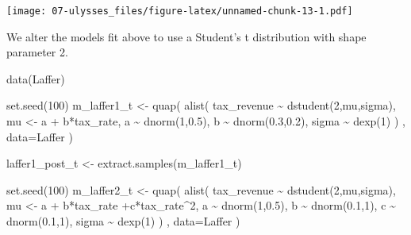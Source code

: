 \documentclass[
]{book}
\newenvironment{Shaded}{\begin{snugshade}}{\end{snugshade}}
\newcommand{\AttributeTok}[1]{\textcolor[rgb]{0.77,0.63,0.00}{#1}}
\newcommand{\DecValTok}[1]{\textcolor[rgb]{0.00,0.00,0.81}{#1}}
\newcommand{\FloatTok}[1]{\textcolor[rgb]{0.00,0.00,0.81}{#1}}
\newcommand{\FunctionTok}[1]{\textcolor[rgb]{0.00,0.00,0.00}{#1}}
\newcommand{\NormalTok}[1]{#1}
\newcommand{\OtherTok}[1]{\textcolor[rgb]{0.56,0.35,0.01}{#1}}
\newcommand{\SpecialCharTok}[1]{\textcolor[rgb]{0.00,0.00,0.00}{#1}}
\begin{document}
\texttt{[image: 07-ulysses\_files/figure-latex/unnamed-chunk-13-1.pdf]}

We alter the models fit above to use a Student's t distribution with shape parameter 2.

\begin{Shaded}
\begin{Highlighting}[]
\FunctionTok{data}\NormalTok{(Laffer)}

\FunctionTok{set.seed}\NormalTok{(}\DecValTok{100}\NormalTok{)}
\NormalTok{ m\_laffer1\_t }\OtherTok{\textless{}{-}} \FunctionTok{quap}\NormalTok{( }\FunctionTok{alist}\NormalTok{(}
\NormalTok{ tax\_revenue }\SpecialCharTok{\textasciitilde{}} \FunctionTok{dstudent}\NormalTok{(}\DecValTok{2}\NormalTok{,mu,sigma), }
\NormalTok{ mu }\OtherTok{\textless{}{-}}\NormalTok{ a }\SpecialCharTok{+}\NormalTok{ b}\SpecialCharTok{*}\NormalTok{tax\_rate, }
\NormalTok{ a }\SpecialCharTok{\textasciitilde{}} \FunctionTok{dnorm}\NormalTok{(}\DecValTok{1}\NormalTok{,}\FloatTok{0.5}\NormalTok{), }
\NormalTok{ b }\SpecialCharTok{\textasciitilde{}} \FunctionTok{dnorm}\NormalTok{(}\FloatTok{0.3}\NormalTok{,}\FloatTok{0.2}\NormalTok{), }
\NormalTok{ sigma }\SpecialCharTok{\textasciitilde{}} \FunctionTok{dexp}\NormalTok{(}\DecValTok{1}\NormalTok{)}
\NormalTok{ ) , }\AttributeTok{data=}\NormalTok{Laffer )}
 
\NormalTok{ laffer1\_post\_t }\OtherTok{\textless{}{-}} \FunctionTok{extract.samples}\NormalTok{(m\_laffer1\_t)}

 \FunctionTok{set.seed}\NormalTok{(}\DecValTok{100}\NormalTok{)}
\NormalTok{ m\_laffer2\_t }\OtherTok{\textless{}{-}} \FunctionTok{quap}\NormalTok{( }\FunctionTok{alist}\NormalTok{(}
\NormalTok{ tax\_revenue }\SpecialCharTok{\textasciitilde{}} \FunctionTok{dstudent}\NormalTok{(}\DecValTok{2}\NormalTok{,mu,sigma), }
\NormalTok{ mu }\OtherTok{\textless{}{-}}\NormalTok{ a }\SpecialCharTok{+}\NormalTok{ b}\SpecialCharTok{*}\NormalTok{tax\_rate }\SpecialCharTok{+}\NormalTok{c}\SpecialCharTok{*}\NormalTok{tax\_rate}\SpecialCharTok{\^{}}\DecValTok{2}\NormalTok{, }
\NormalTok{ a }\SpecialCharTok{\textasciitilde{}} \FunctionTok{dnorm}\NormalTok{(}\DecValTok{1}\NormalTok{,}\FloatTok{0.5}\NormalTok{), }
\NormalTok{ b }\SpecialCharTok{\textasciitilde{}} \FunctionTok{dnorm}\NormalTok{(}\FloatTok{0.1}\NormalTok{,}\DecValTok{1}\NormalTok{), }
\NormalTok{ c }\SpecialCharTok{\textasciitilde{}} \FunctionTok{dnorm}\NormalTok{(}\FloatTok{0.1}\NormalTok{,}\DecValTok{1}\NormalTok{),}
\NormalTok{ sigma }\SpecialCharTok{\textasciitilde{}} \FunctionTok{dexp}\NormalTok{(}\DecValTok{1}\NormalTok{)}
\NormalTok{ ) , }\AttributeTok{data=}\NormalTok{Laffer )}
 

\end{Highlighting}
\end{Shaded}
\end{document}
